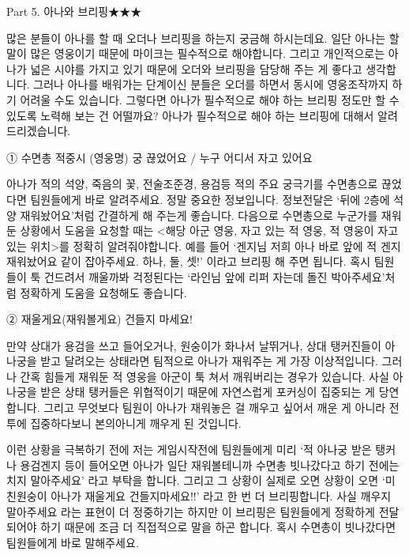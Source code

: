  


 

Part 5. 아나와 브리핑★★★

 

많은 분들이 아나를 할 때 오더나 브리핑을 하는지 궁금해 하시는데요. 일단 아나는 할 말이 많은 영웅이기 때문에 마이크는 필수적으로 해야합니다. 그리고 개인적으로는 아나가 넓은 시야를 가지고 있기 때문에 오더와 브리핑을 담당해 주는 게 좋다고 생각합니다. 그러나 아나를 배워가는 단계이신 분들은 오더를 하면서 동시에 영웅조작까지 하기 어려울 수도 있습니다. 그렇다면 아나가 필수적으로 해야 하는 브리핑 정도만 할 수 있도록 노력해 보는 건 어떨까요? 아나가 필수적으로 해야 하는 브리핑에 대해서 알려드리겠습니다.

 

① 수면총 적중시 (영웅명) 궁 끊었어요 / 누구 어디서 자고 있어요

아나가 적의 석양, 죽음의 꽃, 전술조준경, 용검등 적의 주요 궁극기를 수면총으로 끊었다면 팀원들에게 바로 알려주세요. 정말 중요한 정보입니다. 정보전달은 ‘뒤에 2층에 석양 재워놨어요’처럼 간결하게 해 주는게 좋습니다. 다음으로 수면총으로 누군가를 재워둔 상황에서 도움을 요청할 때는 <해당 아군 영웅, 자고 있는 적 영웅, 적 영웅이 자고있는 위치>를 정확히 알려줘야합니다. 예를 들어 ‘겐지님 저희 아나 바로 앞에 적 겐지 재워놨어요 같이 잡아주세요. 하나, 둘, 셋!’ 이라고 브리핑 해 주면 됩니다. 혹시 팀원들이 툭 건드려서 깨울까봐 걱정된다는 ‘라인님 앞에 리퍼 자는데 돌진 박아주세요’처럼 정확하게 도움을 요청해도 좋습니다.

 

② 재울게요(재워볼게요) 건들지 마세요!

만약 상대가 용검을 쓰고 들어오거나, 원숭이가 화나서 날뛰거나, 상대 탱커진들이 아나궁을 받고 달려오는 상태라면 팀적으로 아나가 재워주는 게 가장 이상적입니다. 그러나 간혹 힘들게 재워둔 적 영웅을 아군이 툭 쳐서 깨워버리는 경우가 있습니다. 사실 아나궁을 받은 상태 탱커들은 위협적이기 때문에 자연스럽게 포커싱이 집중되는 게 당연합니다. 그리고 무엇보다 팀원이 아나가 재워놓은 걸 깨우고 싶어서 깨운 게 아니라 전투에 집중하다보니 본의아니게 깨우게 된 것입니다.

 

이런 상황을 극복하기 전에 저는 게임시작전에 팀원들에게 미리 ‘적 아나궁 받은 탱커나 용검겐지 등이 들어오면 아나가 일단 재워볼테니까 수면총 빗나갔다고 하기 전에는 치지 말아주세요’ 라고 부탁을 합니다. 그리고 그 상황이 실제로 오면 상황이 오면 ‘미친원숭이 아나가 재울게요 건들지마세요!!’ 라고 한 번 더 브리핑합니다. 사실 깨우지 말아주세요 라는 표현이 더 정중하기는 하지만 이 브리핑은 팀원들에게 정확하게 전달되어야 하기 때문에 조금 더 직접적으로 말을 하곤 합니다. 혹시 수면총이 빗나갔다면 팀원들에게 바로 말해주세요.

